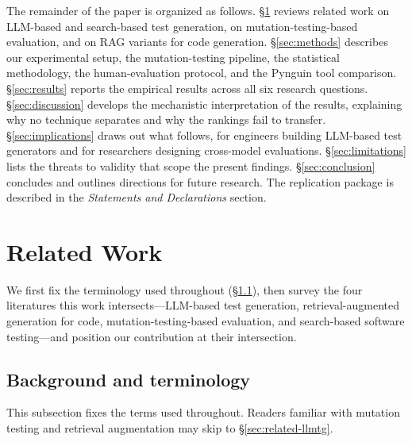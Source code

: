 \documentclass[smallextended]{svjour3}
\begin{document}
The remainder of the paper is organized as follows.
\S\ref{sec:related} reviews related work on LLM-based and
search-based test generation, on mutation-testing-based evaluation,
and on RAG variants for code generation. \S\ref{sec:methods}
describes our experimental setup, the mutation-testing pipeline,
the statistical methodology, the human-evaluation protocol, and
the Pynguin tool comparison. \S\ref{sec:results} reports the
empirical results across all six research questions.
\S\ref{sec:discussion} develops the mechanistic interpretation of
the results, explaining why no technique separates and why the
rankings fail to transfer. \S\ref{sec:implications} draws out what
follows, for engineers building LLM-based test generators and for
researchers designing cross-model evaluations.
\S\ref{sec:limitations} lists the threats to validity that scope the
present findings.
\S\ref{sec:conclusion} concludes and outlines directions for future
research. The replication package is described in the
\emph{Statements and Declarations} section.


\section{Related Work}\label{sec:related}
We first fix the terminology used throughout
(\S\ref{sec:related-background}), then survey the four literatures
this work intersects---LLM-based test generation, retrieval-augmented
generation for code, mutation-testing-based evaluation, and
search-based software testing---and position our contribution at
their intersection.

\subsection{Background and terminology}\label{sec:related-background}

This subsection fixes the terms used throughout. Readers familiar
with mutation testing and retrieval augmentation may skip to
\S\ref{sec:related-llmtg}.
\end{document}
